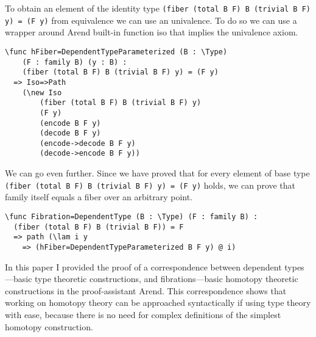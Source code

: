 To obtain an element of the identity type \texttt{(fiber (total B F) B (trivial B F) y) = (F y)} from equivalence we can use an univalence. To do so we can use a wrapper around Arend built-in function iso that implies the univalence axiom.

\begin{ListingEnv}[H]
\begin{lstlisting}
\func hFiber=DependentTypeParameterized (B : \Type) 
	(F : family B) (y : B) : 
	(fiber (total B F) B (trivial B F) y) = (F y)
  => Iso=>Path 
  	(\new Iso 
  		(fiber (total B F) B (trivial B F) y) 
  		(F y) 
  		(encode B F y) 
  		(decode B F y) 
  		(encode->decode B F y) 
  		(decode->encode B F y))
\end{lstlisting}
\end{ListingEnv}

We can go even further. Since we have proved that for every element of base type \texttt{(fiber (total B F) B (trivial B F) y) = (F y)} holds, we can prove that family itself equals a fiber over an arbitrary point.

\begin{ListingEnv}[H]
\begin{lstlisting}
\func Fibration=DependentType (B : \Type) (F : family B) : 
  (fiber (total B F) B (trivial B F)) = F
  => path (\lam i y
    => (hFiber=DependentTypeParameterized B F y) @ i)
\end{lstlisting}
\end{ListingEnv}

\Conc

In this paper I provided the proof of a correspondence between dependent types---basic type theoretic constructions, and fibrations---basic homotopy theoretic constructions in the proof-assistant Arend. This correspondence shows that working on homotopy theory can be approached syntactically if using type theory with ease, because there is no need for complex definitions of the simplest homotopy construction.

\begin{otherlanguage}{english}
\printbibliography[%
    heading=bibintoc%
    ,title=Bibliography
]
\end{otherlanguage}


